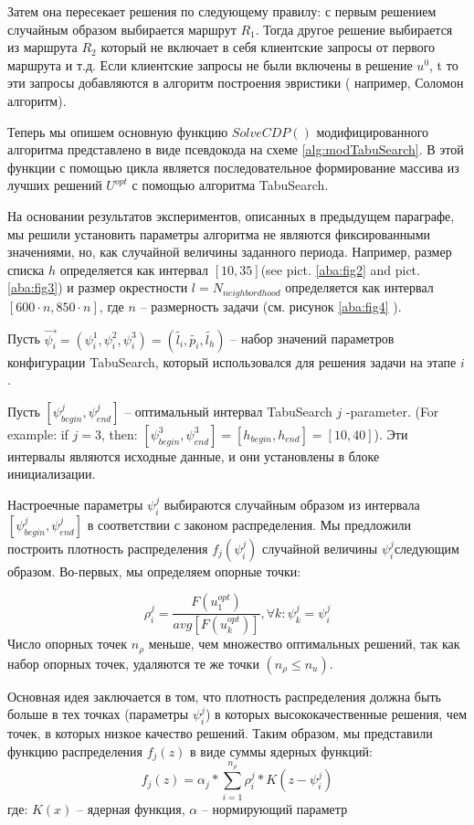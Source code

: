 \documentclass[]{TAACpaper}
\begin{document}
Затем она пересекает решения по следующему правилу: с первым решением случайным образом выбирается маршрут $R_1$. Тогда другое решение выбирается из маршрута $R_2$ который не включает в себя клиентские запросы от первого маршрута и т.д. Если клиентские запросы не были включены в решение  $u^0$, t то эти запросы добавляются в алгоритм построения эвристики ( например, Соломон алгоритм).


Теперь мы опишем основную функцию $SolveCDP()$  модифицированного алгоритма представлено в виде псевдокода на схеме \ref{alg:modTabuSearch}. В этой функции с помощью цикла является последовательное формирование массива из лучших решений $U^{opt}$ с помощью алгоритма TabuSearch.  

На основании результатов экспериментов, описанных в предыдущем параграфе, мы решили установить параметры алгоритма не являются фиксированными значениями, но, как случайной величины заданного периода. Например, размер списка $h$  определяется как интервал  $[10,35]$(see pict. \ref{aba:fig2} and  pict. \ref{aba:fig3}) и размер окрестности $l=N_{neighbordhood}$ определяется как интервал $[600\cdot n,850\cdot n]$, где $n$ -- размерность задачи (см. рисунок \ref{aba:fig4} ).

Пусть $\vec{\psi_i} = (\psi^1_i,\psi^2_i,\psi^3_i) = (\tilde{l_i},\tilde{p_i},\tilde{l_h})$ -- набор значений параметров конфигурации TabuSearch, который использовался для решения задачи на этапе $i$.

Пусть $[\psi^j_{begin}, \psi^j_{end}]$ -- оптимальный интервал TabuSearch $j$ -parameter. (For example: if $j=3$, then: $[\psi^3_{begin}, \psi^3_{end}]= [h_{begin}, h_{end}] = [10, 40] $).
Эти интервалы являются исходные данные, и они установлены в блоке инициализации.

Настроечные параметры  $\psi^j_i $ выбираются случайным образом из интервала $[\psi^j_{begin}, \psi^j_{end}]$ в соответствии с законом распределения. Мы предложили построить плотность распределения $f_j(\psi^j_i)$ случайной величины $\psi^j_i$следующим образом. Во-первых, мы определяем опорные точки:
 
 \begin{equation} \label{anchor_points}
     \rho^j_i =  \dfrac{F(u^{opt}_1)}{avg[F(u^{opt}_k)]}, \forall k: \psi^j_k = \psi^j_i
 \end{equation}
Число опорных точек $n_{\rho}$  меньше, чем множество оптимальных решений, так как набор опорных точек, удаляются те же точки $(n_{\rho} \leq  n_u)$.
 
Основная идея заключается в том, что плотность распределения должна быть больше в тех точках (параметры  $\psi^j_i$) в которых высококачественные решения, чем точек, в которых низкое качество решений.
Таким образом, мы представили функцию распределения $f_j(z)$ в виде суммы ядерных функций:
 \begin{equation} \label{dist_density}
 f_j(z) = \alpha_j * \sum\limits_{i=1}^{n_{\rho}}  \rho^j_i * K(z -  \psi^j_i)
 \end{equation}
 где: $K(x)$ -- ядерная функция, $ \alpha$ -- нормирующий параметр
 
\end{document}

